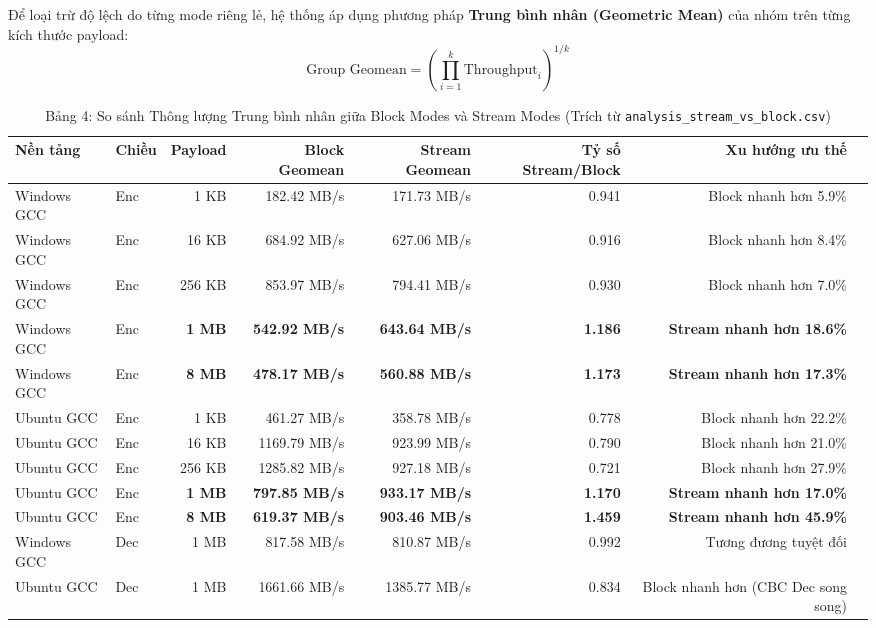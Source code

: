 \documentclass[12pt, a4paper]{report}
\begin{document}
Để loại trừ độ lệch do từng mode riêng lẻ, hệ thống áp dụng phương pháp \textbf{Trung bình nhân (Geometric Mean)} của nhóm trên từng kích thước payload:
\[ \text{Group Geomean} = \left( \prod_{i=1}^k \text{Throughput}_i \right)^{1/k} \]

\begin{table}[H]
\centering
\small
\caption{Bảng 4: So sánh Thông lượng Trung bình nhân giữa Block Modes và Stream Modes (Trích từ \texttt{analysis\_stream\_vs\_block.csv})}
\label{tab:stream_vs_block}
\begin{tabular}{llrrrrrl}
\toprule
\textbf{Nền tảng} & \textbf{Chiều} & \textbf{Payload} & \textbf{Block Geomean} & \textbf{Stream Geomean} & \textbf{Tỷ số Stream/Block} & \textbf{Xu hướng ưu thế} \\
\midrule
Windows GCC & Enc & 1 KB & 182.42 MB/s & 171.73 MB/s & 0.941 & Block nhanh hơn 5.9\% \\
Windows GCC & Enc & 16 KB & 684.92 MB/s & 627.06 MB/s & 0.916 & Block nhanh hơn 8.4\% \\
Windows GCC & Enc & 256 KB & 853.97 MB/s & 794.41 MB/s & 0.930 & Block nhanh hơn 7.0\% \\
Windows GCC & Enc & \textbf{1 MB} & \textbf{542.92 MB/s} & \textbf{643.64 MB/s} & \textbf{1.186} & \textbf{Stream nhanh hơn 18.6\%} \\
Windows GCC & Enc & \textbf{8 MB} & \textbf{478.17 MB/s} & \textbf{560.88 MB/s} & \textbf{1.173} & \textbf{Stream nhanh hơn 17.3\%} \\
Ubuntu GCC & Enc & 1 KB & 461.27 MB/s & 358.78 MB/s & 0.778 & Block nhanh hơn 22.2\% \\
Ubuntu GCC & Enc & 16 KB & 1169.79 MB/s & 923.99 MB/s & 0.790 & Block nhanh hơn 21.0\% \\
Ubuntu GCC & Enc & 256 KB & 1285.82 MB/s & 927.18 MB/s & 0.721 & Block nhanh hơn 27.9\% \\
Ubuntu GCC & Enc & \textbf{1 MB} & \textbf{797.85 MB/s} & \textbf{933.17 MB/s} & \textbf{1.170} & \textbf{Stream nhanh hơn 17.0\%} \\
Ubuntu GCC & Enc & \textbf{8 MB} & \textbf{619.37 MB/s} & \textbf{903.46 MB/s} & \textbf{1.459} & \textbf{Stream nhanh hơn 45.9\%} \\
Windows GCC & Dec & 1 MB & 817.58 MB/s & 810.87 MB/s & 0.992 & Tương đương tuyệt đối \\
Ubuntu GCC & Dec & 1 MB & 1661.66 MB/s & 1385.77 MB/s & 0.834 & Block nhanh hơn (CBC Dec song song) \\
\bottomrule
\end{tabular}
\end{table}
\end{document}
